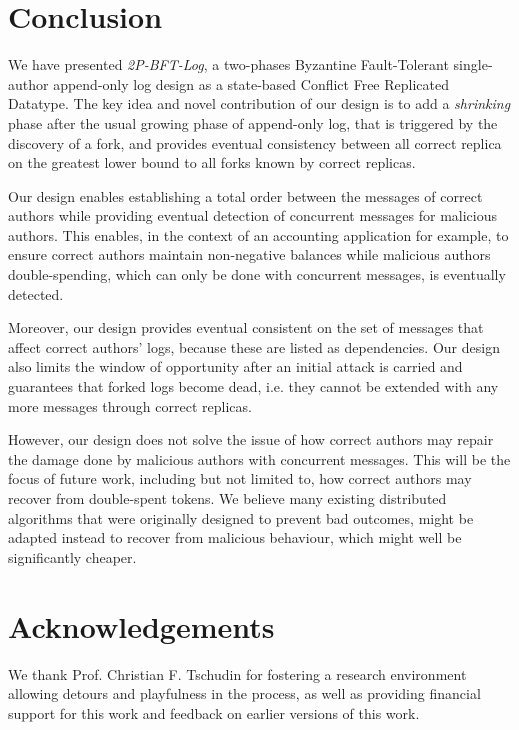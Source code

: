 \documentclass[9pt, oneside]{article}   	%
\begin{document}
\section{Conclusion}
\label{sec:conclusion}

We have presented \textit{2P-BFT-Log}, a two-phases Byzantine Fault-Tolerant single-author append-only log design as a state-based Conflict Free Replicated Datatype. The key idea and novel contribution of our design is to add a \textit{shrinking} phase after the usual growing phase of append-only log, that is triggered by the discovery of a fork, and provides eventual consistency between all correct replica on the greatest lower bound to all forks known by correct replicas.

Our design enables establishing a total order between the messages of correct authors while providing eventual detection of concurrent messages for malicious authors. This enables, in the context of an accounting application for example, to ensure correct authors maintain non-negative balances while malicious authors double-spending, which can only be done with concurrent messages, is eventually detected.

Moreover, our design provides eventual consistent on the set of messages that affect correct authors' logs, because these are listed as dependencies. Our design also limits the window of opportunity after an initial attack is carried and guarantees that forked logs become dead, i.e. they cannot be extended with any more messages through correct replicas.

However, our design does not solve the issue of how correct authors may repair the damage done by malicious authors with concurrent messages. This will be the focus of future work, including but not limited to, how correct authors may recover from double-spent tokens. We believe many existing distributed algorithms that were originally designed to prevent bad outcomes, might be adapted instead to recover from malicious behaviour, which might well be significantly cheaper.

\section{Acknowledgements}
\label{sec:acknowledgements}

We thank Prof. Christian F. Tschudin for fostering a research environment allowing detours and playfulness in the process, as well as providing financial support for this work and feedback on earlier versions of this work. 
\end{document}
